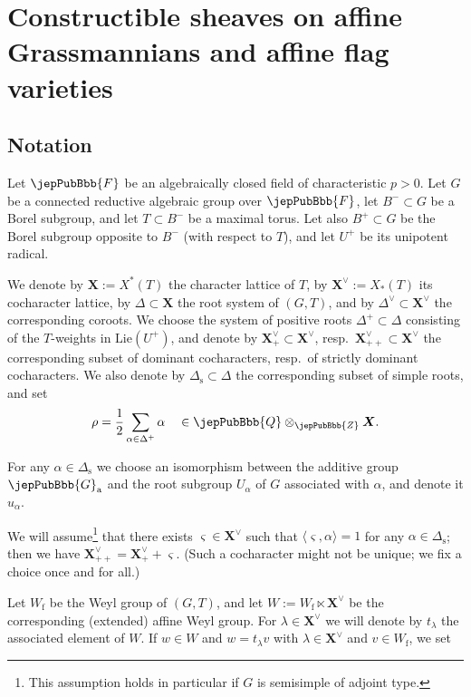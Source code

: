 \section{Constructible sheaves on affine Grassmannians and affine flag varieties}
\label{jep104local028}

\subsection{Notation}
\label{jep104local037}

Let $\jepPubBbb{F}$ be an algebraically closed field of characteristic $p>0$. Let $G$ be a connected reductive algebraic group over $\jepPubBbb{F}$, let $B^- \subset G$ be a Borel subgroup, and let $T \subset B^-$ be a maximal torus. Let also $B^+ \subset G$ be the Borel subgroup opposite to $B^-$ (with respect to $T$), and let $U^+$ be its unipotent radical.

We denote by $\boldsymbol{X}:=X^*(T)$ the character lattice of $T$, by $\boldsymbol{X}^\vee := X_*(T)$ its cocharacter lattice, by $\Delta \subset \boldsymbol{X}$ the root system of $(G,T)$, and by $\Delta^\vee \subset \boldsymbol{X}^\vee$ the corresponding coroots. We choose the system of positive roots $\Delta^+ \subset \Delta$ consisting of the $T$-weights in $\mathrm{Lie}(U^+)$, and denote by $\boldsymbol{X}^\vee_+ \subset \boldsymbol{X}^\vee$, resp.~$\boldsymbol{X}^\vee_{++} \subset \boldsymbol{X}^\vee$ the corresponding subset of dominant cocharacters, resp.~of strictly dominant cocharacters. We also denote by $\Delta_{\mathrm{s}} \subset \Delta$ the corresponding subset of simple roots, and set
\[
 \rho = \frac{1}{2} \sum_{\alpha \in \Delta^+} \alpha \quad \in \jepPubBbb{Q} \otimes_{\jepPubBbb{Z}} \boldsymbol{X}.
\]
 
 For any $\alpha \in \Delta_{\mathrm{s}}$ we choose an isomorphism between the additive group $\jepPubBbb{G}_{\mathrm{a}}$ and the root subgroup $U_\alpha$ of $G$ associated with $\alpha$, and denote it $u_\alpha$.
 
 We will assume\footnote{This assumption holds in particular if $G$ is semisimple of adjoint type.} that there exists $\varsigma \in \boldsymbol{X}^\vee$ such that $\langle \varsigma, \alpha \rangle = 1$ for any $\alpha \in \Delta_{\mathrm{s}}$; then we have $\boldsymbol{X}^\vee_{++} = \boldsymbol{X}^\vee_+ + \varsigma$. (Such a cocharacter might not be unique; we fix a choice once and for all.)
 
 Let $W_{\mathrm{f}}$ be the Weyl group of $(G,T)$, and let $W:=W_{\mathrm{f}} \ltimes \boldsymbol{X}^\vee$ be the corresponding (extended) affine Weyl group. For $\lambda \in \boldsymbol{X}^\vee$ we will denote by $t_\lambda$ the associated element of $W$. If $w \in W$ and $w = t_\lambda v$ with $\lambda \in \boldsymbol{X}^\vee$ and $v \in W_{\mathrm{f}}$, we set

